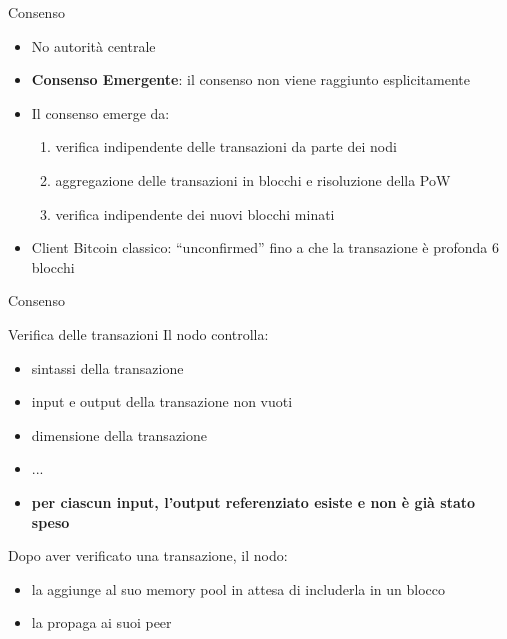 \documentclass{beamer}
\begin{document}
  
  
  \begin{frame}{Consenso}
    \begin{itemize}
        \item No autorità centrale
        \item \textbf{Consenso Emergente}: il consenso non viene raggiunto esplicitamente
        \item Il consenso emerge da:
        \begin{enumerate}
            \item verifica indipendente delle transazioni da parte dei nodi
            \item aggregazione delle transazioni in blocchi e risoluzione della PoW
            \item verifica indipendente dei nuovi blocchi minati 
        \end{enumerate}
        \item Client Bitcoin classico:  ``unconfirmed'' fino a che la transazione è profonda 6 blocchi
    \end{itemize}
  \end{frame}
  
  
  
  
  \begin{frame}{Consenso}
      \begin{block}{Verifica delle transazioni}
      Il nodo controlla: 
        \begin{itemize}
            \item sintassi della transazione
            \item input e output della transazione non vuoti
            \item dimensione della transazione 
            \item ...
            \item \textbf{per ciascun input, l'output referenziato esiste e non è già stato speso}
        \end{itemize}
      \end{block}
      Dopo aver verificato una transazione, il nodo:
      \begin{itemize}
          \item la aggiunge al suo memory pool in attesa di includerla in un blocco
          \item la propaga ai suoi peer
      \end{itemize}
  \end{frame}
  
\end{document}

